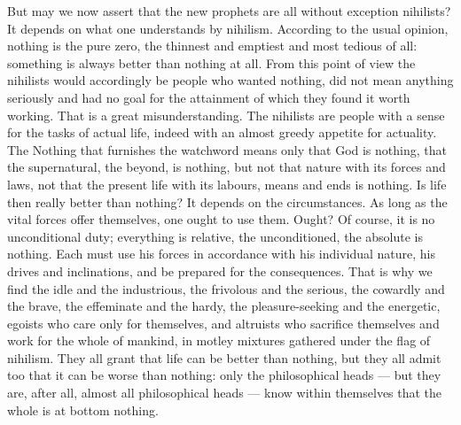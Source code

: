 \documentclass[12pt,a4paper,openany]{book}
\newcommand{\opage}[1]{\marginnote{\footnotesize\textit{[#1]}}}
\begin{document}
But may we now assert that the new prophets are all
without exception nihilists? It depends on
what one understands by nihilism. According to the usual
opinion, nothing is the pure zero, the thinnest and
emptiest and most tedious of all: something is always
better than nothing at all. From this point of view the nihilists
would accordingly be people who wanted nothing, did not
mean anything seriously and had no goal
for the attainment of which they found it worth working. That
is a great misunderstanding. The nihilists are people with
a sense for the tasks of actual life, indeed with an almost
greedy appetite for actuality. The Nothing that
furnishes the watchword means only that God is nothing, that the
supernatural, the beyond, is nothing, but not that
\setcounter{footnote}{0}%
\opage{94}nature with its forces and laws, not that the present
life with its labours, means and ends is nothing.
Is life then really better than nothing? It depends
on the circumstances. As long as the vital forces offer
themselves, one ought to use them. Ought? Of course,
it is no unconditional duty; everything is relative, the unconditioned,
the absolute is nothing. Each must use his
forces in accordance with his individual
nature, his drives and inclinations, and be prepared
for the consequences. That is why we find the idle and the industrious,
the frivolous and the serious, the cowardly and the brave, the effeminate
and the hardy, the pleasure-seeking and the energetic,
egoists who care only for themselves, and altruists who
sacrifice themselves and work for the whole of mankind, in motley
mixtures gathered under the flag of nihilism. They all
grant that life can be better than nothing, but
they all admit too that it can be worse than
nothing: only the philosophical heads --- but they are,
after all, almost all philosophical heads --- know within
themselves that the whole is at bottom nothing.
\end{document}
